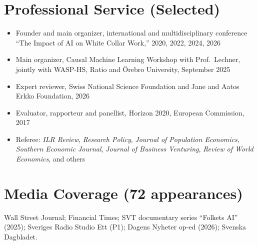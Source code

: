 \documentclass[11pt,a4paper]{article}
\newcommand{\cventry}[1]{\item #1}
\newcommand{\sectioncount}[1]{\textcolor{countgray}{\normalfont(#1)}}
\begin{document}
\section{Professional Service (Selected)}
\vspace{-2pt}
\begin{itemize}
 \cventry{Founder and main organizer, international and multidisciplinary conference ``The Impact of AI on White Collar Work,'' 2020, 2022, 2024, 2026}
 \cventry{Main organizer, Causal Machine Learning Workshop with Prof.\ Lechner, jointly with WASP-HS, Ratio and Örebro University, September 2025}
 \cventry{Expert reviewer, Swiss National Science Foundation and Jane and Aatos Erkko Foundation, 2026} %
 \cventry{Evaluator, rapporteur and panellist, Horizon 2020, European Commission, 2017}
 \cventry{Referee: \textit{ILR Review}, \textit{Research Policy}, \textit{Journal of Population Economics}, \textit{Southern Economic Journal}, \textit{Journal of Business Venturing}, \textit{Review of World Economics}, and others}
\end{itemize}

\section{Media Coverage \sectioncount{72 appearances}}
\vspace{-2pt}
Wall Street Journal; Financial Times; SVT documentary series ``Folkets AI'' (2025); Sveriges Radio Studio Ett (P1); Dagens Nyheter op-ed (2026); Svenska Dagbladet.

\vspace{2pt}
\end{document}
